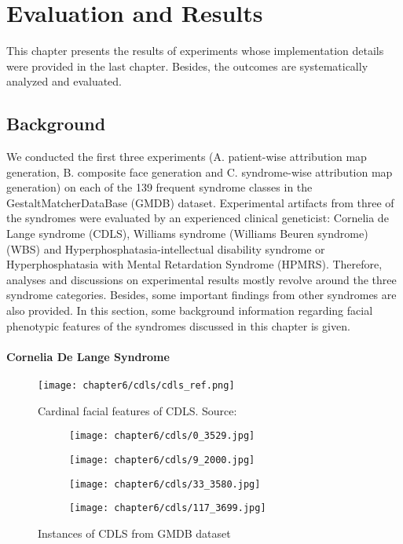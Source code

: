 \documentclass[../report.tex]{subfiles}
\begin{document}
    \chapter{Evaluation and Results}
	This chapter presents the results of experiments whose implementation details were provided in the last chapter. Besides, the outcomes are systematically analyzed and evaluated.
	
	
	\section{Background}
	We conducted the first three experiments (A. patient-wise attribution map generation, B. composite face generation and C. syndrome-wise attribution map generation) on each of the 139 frequent syndrome classes in the GestaltMatcherDataBase (GMDB) dataset. Experimental artifacts from three of the syndromes were evaluated by an experienced clinical geneticist: Cornelia de Lange syndrome (CDLS), Williams syndrome (Williams Beuren syndrome) (WBS) and Hyperphosphatasia-intellectual disability syndrome or Hyperphosphatasia with Mental Retardation Syndrome (HPMRS). Therefore, analyses and discussions on experimental results mostly revolve around the three syndrome categories. Besides, some important findings from other syndromes are also provided. In this section, some background information regarding facial phenotypic features of the syndromes discussed in this chapter is given. 
	
	\subsubsection{Cornelia De Lange Syndrome}
		\begin{figure}[H]\label{fig_cdls_char}
		\centering
		\texttt{[image: chapter6/cdls/cdls\_ref.png]}	
		\caption[Cardinal features of CDLS]{Cardinal facial features of CDLS. Source: \cite{kline2018diagnosis}}
	\end{figure}
	
	\begin{figure}[H]\label{fig_cdls}
		\centering
		\begin{subfigure}[b]{0.24\textwidth}
			\centering
			\texttt{[image: chapter6/cdls/0\_3529.jpg]}
		\end{subfigure}
		\begin{subfigure}[b]{0.24\textwidth}
			\centering
			\texttt{[image: chapter6/cdls/9\_2000.jpg]}
		\end{subfigure}	
		\begin{subfigure}[b]{0.24\textwidth}
			\centering
			\texttt{[image: chapter6/cdls/33\_3580.jpg]}
		\end{subfigure}	
		\begin{subfigure}[b]{0.24\textwidth}
			\centering
			\texttt{[image: chapter6/cdls/117\_3699.jpg]}
		\end{subfigure}
		\caption[Instances of CDLS from GMDB dataset]{Instances of CDLS from GMDB dataset}
	\end{figure}
	
\end{document}
